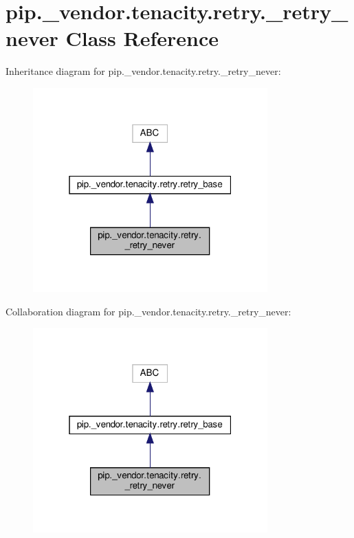 \hypertarget{classpip_1_1__vendor_1_1tenacity_1_1retry_1_1__retry__never}{}\section{pip.\+\_\+vendor.\+tenacity.\+retry.\+\_\+retry\+\_\+never Class Reference}
\label{classpip_1_1__vendor_1_1tenacity_1_1retry_1_1__retry__never}


Inheritance diagram for pip.\+\_\+vendor.\+tenacity.\+retry.\+\_\+retry\+\_\+never\+:
\nopagebreak
\begin{figure}[H]
\begin{center}
\leavevmode
\includegraphics[width=256pt]{classpip_1_1__vendor_1_1tenacity_1_1retry_1_1__retry__never__inherit__graph}
\end{center}
\end{figure}


Collaboration diagram for pip.\+\_\+vendor.\+tenacity.\+retry.\+\_\+retry\+\_\+never\+:
\nopagebreak
\begin{figure}[H]
\begin{center}
\leavevmode
\includegraphics[width=256pt]{classpip_1_1__vendor_1_1tenacity_1_1retry_1_1__retry__never__coll__graph}
\end{center}
\end{figure}
